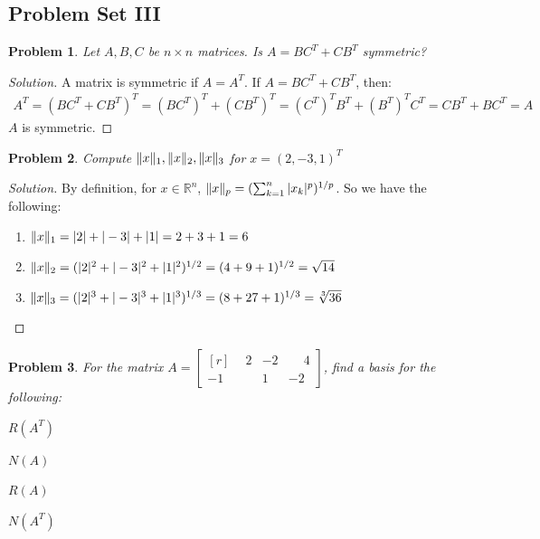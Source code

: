 \documentclass[oneside]{book}
\theoremstyle{mystyle}
\newtheorem{problem}{Problem}[section]
\DeclarePairedDelimiter\norm{\lVert}{\rVert}
\begin{document}
\subsection{Problem Set III}
\begin{problem}
Let $A,B,C$ be $n\times n$ matrices. Is $A = BC^T + CB^T$ symmetric?
\end{problem}
\begin{proof}[Solution]
A matrix is symmetric if $A = A^T$. If $A = BC^T+CB^T$, then:
\begin{align*}
    A^{T}=(BC^{T}+CB^{T})^{T}=(BC^{T})^{T}+(CB^{T})^{T}=(C^{T})^{T}B^{T}+(B^{T})^{T}C^{T}=CB^{T}+BC^{T}=A
\end{align*}
$A$ is symmetric.
\end{proof}
\begin{problem}
Compute $\norm{x}_1, \norm{x}_2, \norm{x}_3$ for $x = (2,-3,1)^T$
\end{problem}
\begin{proof}[Solution]
By definition, for $x\in \mathbb{R}^n$, $\norm{x}_p = (\sum_{k=1}^{n}|x_k|^p)^{1/p}$. So we have the following:
\begin{enumerate}
    \item $\norm{x}_1 = |2|+|-3|+|1| = 2+3+1 = 6$
    \item $\norm{x}_2 = (|2|^2+|-3|^2+|1|^2)^{1/2} = (4+9+1)^{1/2} = \sqrt{14}$
    \item $\norm{x}_3 = (|2|^3+|-3|^3+|1|^3)^{1/3} = (8+27+1)^{1/3} = \sqrt[3]{36}$
\end{enumerate}
\end{proof}
\begin{problem}
For the matrix $A = \begin{bmatrix*}[r] \phantom{-}2 & -2 & \phantom{-}4 \\ -1 & 1 & -2 \end{bmatrix*}$, find a basis for the following:
\begin{enumerate}
\begin{multicols}{4}
    \item $R(A^T)$
    \item $N(A)$
    \item $R(A)$
    \item $N(A^T)$
\end{multicols}
\end{enumerate}
\end{problem}
\end{document}
